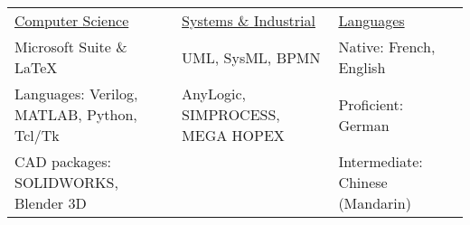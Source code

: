 \documentclass[11pt]{article}
\begin{document}
\begin{center}
\begin{tabular}{lll}
\uline{Computer Science} & \uline{Systems \& Industrial} & \uline{Languages}\\
Microsoft Suite \& \LaTeX & UML, SysML, BPMN & Native: French, English\\
Languages: Verilog, MATLAB, Python, Tcl/Tk & AnyLogic, SIMPROCESS, MEGA HOPEX & Proficient: German\\
CAD packages: SOLIDWORKS, Blender 3D &  & Intermediate: Chinese (Mandarin)\\
\end{tabular}

\end{center}
\end{document}
